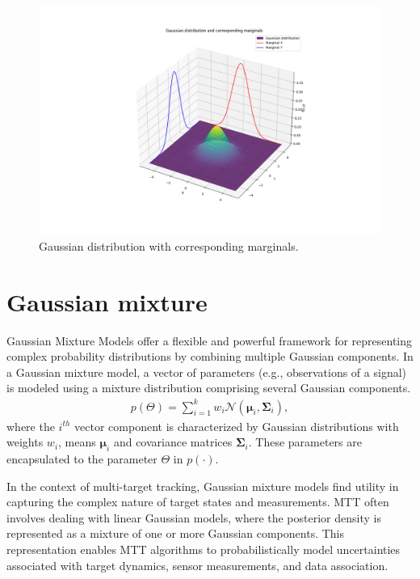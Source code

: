 \begin{figure}[htbp]
    \centering
    \includegraphics[width=1\textwidth]{text/chapter_01/imgs/gauss_with_marginals}
    \caption{Gaussian distribution with corresponding marginals.}
    \label{fig:gaussWithMarginals}
\end{figure}
    \section{Gaussian mixture}
Gaussian Mixture Models offer a flexible and powerful framework for representing complex probability distributions by combining multiple Gaussian components. In a Gaussian mixture model, a vector of parameters (e.g., observations of a signal) is modeled using a mixture distribution comprising several Gaussian components.
    \begin{align}
        p(\Theta) = \sum_{i=1}^k w_i \mathcal{N}(\mathbf{\mu}_i, \mathbf{\Sigma}_i),
    \end{align}
where the $i^{th}$ vector component is characterized by Gaussian distributions with weights $w_i$, means $\mathbf{\mu}
_i$ and covariance matrices $\mathbf{\Sigma}_i$. These parameters are encapsulated to the parameter $\Theta$ in $p(\cdot)$.

In the context of multi-target tracking, Gaussian mixture models find utility in capturing the complex nature of target states and measurements. MTT often involves dealing with linear Gaussian models, where the posterior density is represented as a mixture of one or more Gaussian components. This representation enables MTT algorithms to probabilistically model uncertainties associated with target dynamics, sensor measurements, and data association.

